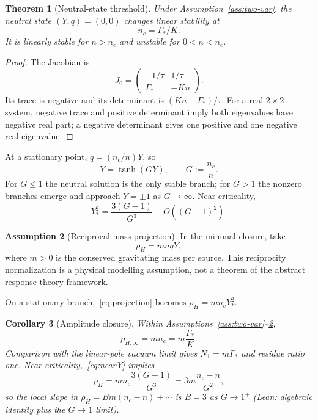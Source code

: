 \documentclass[11pt]{article}
\newtheorem{theorem}{Theorem}[section]
\newtheorem{corollary}[theorem]{Corollary}
\theoremstyle{definition}
\newtheorem{assumption}[theorem]{Assumption}
\theoremstyle{remark}
\begin{document}
\begin{theorem}[Neutral-state threshold]
\label{thm:neutral-threshold}
Under Assumption~\ref{ass:two-var}, the neutral state $(Y,q)=(0,0)$ changes linear stability at
\begin{equation}
\label{eq:nc}
\boxed{n_c=\Gamma_*/K.}
\end{equation}
It is linearly stable for $n>n_c$ and unstable for $0<n<n_c$.
\end{theorem}

\begin{proof}
The Jacobian is
\[
J_0=\begin{pmatrix}-1/\tau&1/\tau\\ \Gamma_*&-Kn\end{pmatrix}.
\]
Its trace is negative and its determinant is $(Kn-\Gamma_*)/\tau$.
For a real $2\times2$ system, negative trace and positive determinant imply both eigenvalues have negative real part; a negative determinant gives one positive and one negative real eigenvalue.
\end{proof}

At a stationary point, $q=(n_c/n)Y$, so
\begin{equation}
\label{eq:selfcons}
\boxed{Y=\tanh(GY),\qquad G:=\frac{n_c}{n}.}
\end{equation}
For $G\le1$ the neutral solution is the only stable branch; for $G>1$ the nonzero branches emerge and approach $Y=\pm1$ as $G\to\infty$.
Near criticality,
\begin{equation}
\label{eq:nearY}
\boxed{Y_*^2=\frac{3(G-1)}{G^3}+O((G-1)^2).}
\end{equation}

\begin{assumption}[Reciprocal mass projection]
\label{ass:projection}
In the minimal closure, take
\begin{equation}
\label{eq:projection}
\boxed{\rho_H=m n q Y,}
\end{equation}
where $m>0$ is the conserved gravitating mass per source.
This reciprocity normalization is a physical modelling assumption, not a theorem of the abstract response-theory framework.
\end{assumption}

On a stationary branch,~\eqref{eq:projection} becomes $\rho_H=m n_c Y_*^2$.

\begin{corollary}[Amplitude closure]
\label{cor:amplitude}
Within Assumptions~\ref{ass:two-var}--\ref{ass:projection},
\begin{equation}
\label{eq:rhoInf}
\boxed{\rho_{H,\infty}=m n_c=m\frac{\Gamma_*}{K}.}
\end{equation}
Comparison with the linear-pole vacuum limit gives $N_1=m\Gamma_*$ and residue ratio one.
Near criticality,~\eqref{eq:nearY} implies
\begin{equation}
\rho_H=m n_c\frac{3(G-1)}{G^3}=3m\frac{n_c-n}{G^2},
\end{equation}
so the local slope in $\rho_H=B m(n_c-n)+\cdots$ is $\boxed{B=3}$ as $G\to1^+$ (Lean: algebraic identity plus the $G\to1$ limit).
\end{corollary}
\end{document}
